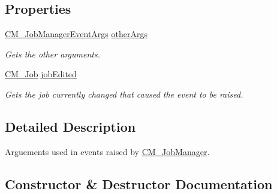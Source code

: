 \subsection*{Properties}
\begin{DoxyCompactItemize}
\item 
\hyperlink{class_c_m___job_manager_event_args}{C\+M\+\_\+\+Job\+Manager\+Event\+Args} \hyperlink{class_c_m___job_manager_job_edited_event_args_a5baf47bf8ecddf8a6f88b0779a504670}{other\+Args}
\begin{DoxyCompactList}\small\item\em Gets the other arguments. \end{DoxyCompactList}\item 
\hyperlink{class_c_m___job}{C\+M\+\_\+\+Job} \hyperlink{class_c_m___job_manager_job_edited_event_args_a7ffe2e303d15476afa5fc9d693367a8e}{job\+Edited}
\begin{DoxyCompactList}\small\item\em Gets the job currently changed that caused the event to be raised. \end{DoxyCompactList}\end{DoxyCompactItemize}


\subsection{Detailed Description}
Arguements used in events raised by \hyperlink{class_c_m___job_manager}{C\+M\+\_\+\+Job\+Manager}. 



\subsection{Constructor \& Destructor Documentation}
\hypertarget{class_c_m___job_manager_job_edited_event_args_a4affe52499a44d68c7c0cae61177583f}{}
